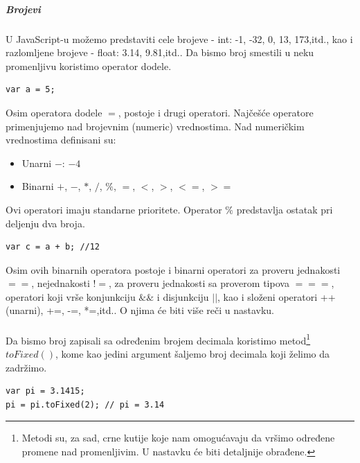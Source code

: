 \documentclass[a4paper]{article}
\begin{document}
\subparagraph{Brojevi}
U JavaScript-u možemo predstaviti cele brojeve - int: -1, -32, 0, 13, 173,itd., kao i razlomljene brojeve - float: 3.14, 9.81,itd..
Da bismo broj smestili u neku promenljivu koristimo operator dodele.
\begin{lstlisting}[backgroundcolor = \color{lightgray}]
var a = 5; 
\end{lstlisting}
Osim operatora dodele $=$, postoje i drugi operatori. Najčešće operatore primenjujemo nad brojevnim (numeric) vrednostima. Nad numeričkim vrednostima definisani su:
\begin{itemize}
    \item Unarni $-$: $-4$
    \item Binarni $+$, $-$, $*$, $/$, $\%$, $=$, $<$, $>$, $<=$, $>=$
\end{itemize}
Ovi operatori imaju standarne prioritete. Operator $\%$ predstavlja ostatak pri deljenju dva broja.\\
\begin{lstlisting}[backgroundcolor = \color{lightgray}]
var c = a + b; //12
\end{lstlisting}
Osim ovih binarnih operatora postoje i binarni operatori za proveru jednakosti $==$, nejednakosti $!=$, za proveru jednakosti sa proverom tipova $===$, operatori koji vrše konjunkciju $\&\&$ i disjunkciju $||$, kao i složeni operatori ++(unarni), +=, -=, *=,itd.. O njima će biti više reči u nastavku. \\\\
Da bismo broj zapisali sa određenim brojem decimala koristimo metod\footnote{Metodi su, za sad, crne kutije koje nam omogućavaju da vršimo određene promene nad promenljivim. U nastavku će biti detaljnije obrađene.} $toFixed()$, kome kao jedini argument šaljemo broj decimala koji želimo da zadržimo. 
\begin{lstlisting}[backgroundcolor = \color{lightgray}]
var pi = 3.1415;
pi = pi.toFixed(2); // pi = 3.14
\end{lstlisting}
\end{document}
